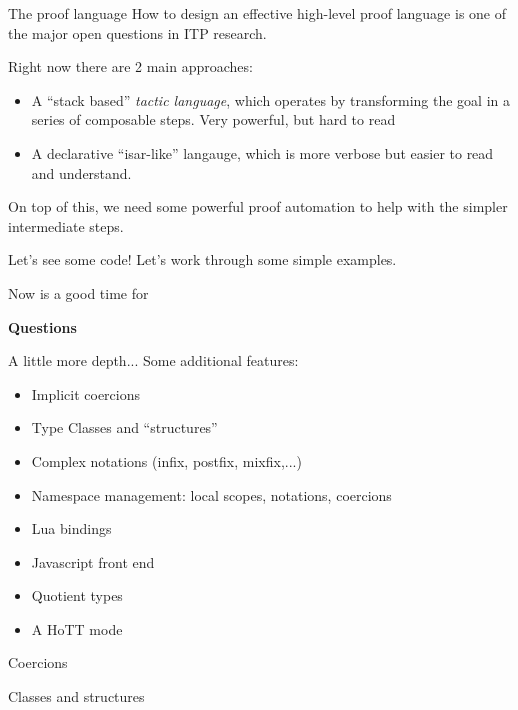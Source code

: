 \documentclass{beamer}
\begin{document}
\begin{frame}{The proof language}
  How to design an effective high-level proof language is one of the
  major open questions in ITP research.\bigskip

  Right now there are 2 main approaches:
  \begin{itemize}
  \item A ``stack based'' \emph{tactic language}, which operates by transforming the goal in a series of composable steps. Very powerful, but hard to read
  \item A declarative ``isar-like'' langauge, which is more verbose but easier to read and understand.
  \end{itemize}
  
  On top of this, we need some powerful proof automation to help with
  the simpler intermediate steps.
\end{frame}

\begin{frame}{Let's see some code!}
  Let's work through some simple examples.\bigskip

  Now is a good time for
  \begin{center}
    {\huge \bf Questions}
  \end{center}
\end{frame}

\begin{frame}[fragile]{A little more depth...}
  Some additional features:
  \begin{itemize}
  \item Implicit coercions
  \item Type Classes and ``structures''
  \item Complex notations (infix, postfix, mixfix,...)
  \item Namespace management: local scopes, notations, coercions
  \item Lua bindings
  \item Javascript front end
  \item Quotient types
  \item A HoTT mode
  \end{itemize}
\end{frame}

\begin{frame}[fragile]{Coercions}
\end{frame}

\begin{frame}[fragile]{Classes and structures}
\end{frame}
\end{document}

